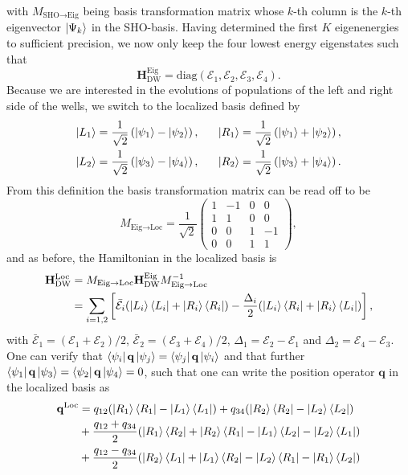 %
with $M_{\text{SHO}\rightarrow\text{Eig}}$ being basis transformation matrix whose $k$-th 
column is the $k$-th eigenvector $\ket{\Psi_k}$ in the SHO-basis.
Having determined the first $K$ eigenenergies to sufficient precision, we now only keep
the four lowest energy eigenstates such that
%
\begin{equation}
    \mathbf{H}_{\text{DW}}^{\text{Eig}} = \text{diag}(\mathcal{E}_1,\mathcal{E}_2,\mathcal{E}_3,\mathcal{E}_4).
\end{equation}
%
Because we are interested in the evolutions of populations of the left and right side
of the wells, we switch to the localized basis defined by
%
\begin{align}
    \ket{L_1} &= \frac{1}{\sqrt{2}} \left( \ket{\psi_1} - \ket{\psi_2} \right), \ \ \ \ \ \ket{R_1} = \frac{1}{\sqrt{2}} \left( \ket{\psi_1} + \ket{\psi_2} \right), \\
    \ket{L_2} &= \frac{1}{\sqrt{2}} \left( \ket{\psi_3} - \ket{\psi_4} \right), \ \ \ \ \ \ket{R_2} = \frac{1}{\sqrt{2}} \left( \ket{\psi_3} + \ket{\psi_4} \right).
\end{align}
%
From this definition the basis transformation matrix can be read off to be
%
\begin{equation}
    M_{\text{Eig}\rightarrow\text{Loc}} = \frac{1}{\sqrt{2}}
    \begin{pmatrix}
        1 & -1 & 0 & 0 \\
        1 & 1 & 0 & 0 \\
        0 & 0 & 1 & -1 \\
        0 & 0 & 1 & 1 
    \end{pmatrix},
\end{equation}
%
and as before, the Hamiltonian in the localized basis is 
%
\begin{align}
    \mathbf{H}_{\text{DW}}^{\text{Loc}} &= M_{\text{Eig}\rightarrow\text{Loc}} 
    \mathbf{H}_{\text{DW}}^{\text{Eig}} M_{\text{Eig}\rightarrow\text{Loc}}^{-1} \\
    &= \sum_{i=1,2} \left[ \bar{\mathcal{E}}_i 
    (\ket{L_i}\bra{L_i}+\ket{R_i}\bra{R_i}) - \frac{\Delta_i}{2}(\ket{L_i}\bra{R_i}+\ket{R_i}\bra{L_i})\right],
\end{align}
%
with $\bar{\mathcal{E}}_1 = (\mathcal{E}_1+\mathcal{E}_2)/2$, $\bar{\mathcal{E}}_2 = (\mathcal{E}_3+\mathcal{E}_4)/2$, 
$\Delta_1 = \mathcal{E}_2- \mathcal{E}_1$ and $\Delta_2 = \mathcal{E}_4- \mathcal{E}_3$.
One can verify that $\bra{\psi_i}\mathbf{q}\ket{\psi_j}=\bra{\psi_j}\mathbf{q}\ket{\psi_i}$
and that further $\bra{\psi_1}\mathbf{q}\ket{\psi_3}=\bra{\psi_2}\mathbf{q}\ket{\psi_4}=0$,
such that one can write the position operator $\mathbf{q}$ in the localized basis as
%
\begin{align}
    \mathbf{q}^{\text{Loc}} &= q_{12} ( \ket{R_1}\bra{R_1} -
    \ket{L_1}\bra{L_1}) + q_{34} ( \ket{R_2}\bra{R_2} -
    \ket{L_2}\bra{L_2} ) \\
    &+ \frac{q_{12}+q_{34}}{2}( \ket{R_1}\bra{R_2}+\ket{R_2}\bra{R_1}-\ket{L_1}\bra{L_2}-\ket{L_2}\bra{L_1} ) \\
    &+ \frac{q_{12}-q_{34}}{2}( \ket{R_2}\bra{L_1}+\ket{L_1}\bra{R_2}-\ket{L_2}\bra{R_1}-\ket{R_1}\bra{L_2} )
\end{align}
%



